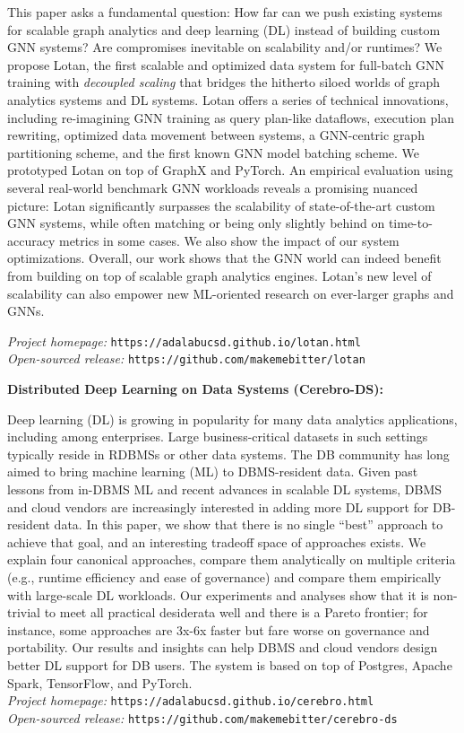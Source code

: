 \documentclass[margin,line]{res}
\begin{document}
\begin{resume}
This paper asks a fundamental question: How far can we push existing systems for scalable graph analytics and deep learning (DL) instead of building custom GNN systems? Are compromises inevitable on scalability and/or runtimes? We propose Lotan, the first scalable and optimized data system for full-batch GNN training with \textit{decoupled scaling} that bridges the hitherto siloed worlds of graph analytics systems and DL systems. Lotan offers a series of technical innovations, including re-imagining GNN training as query plan-like dataflows, execution plan rewriting, optimized data movement between systems, a GNN-centric graph partitioning scheme, and the first known GNN model batching scheme. We prototyped Lotan on top of GraphX and PyTorch. An empirical evaluation using several real-world benchmark GNN workloads reveals a promising nuanced picture: Lotan significantly surpasses the scalability of state-of-the-art custom GNN systems, while often matching or being only slightly behind on time-to-accuracy metrics in some cases. We also show the impact of our system optimizations. Overall, our work shows that the GNN world can indeed benefit from building on top of scalable graph analytics engines. Lotan's new level of scalability can also empower new ML-oriented research on ever-larger graphs and GNNs.

\textit{Project homepage: }\texttt{https://adalabucsd.github.io/lotan.html}\\
\textit{Open-sourced release: }\texttt{https://github.com/makemebitter/lotan}

{\bf Distributed Deep Learning on Data Systems (Cerebro-DS):}

Deep learning (DL) is growing in popularity for many data analytics applications, including among enterprises. Large business-critical datasets in such settings typically reside in RDBMSs or other data systems. The DB community has long aimed to bring machine learning (ML) to DBMS-resident data. Given past lessons from in-DBMS ML and recent advances in scalable DL systems, DBMS and cloud vendors are increasingly interested in adding more DL support for DB-resident data. In this paper, we show that there is no single ``best'' approach to achieve that goal, and an interesting tradeoff space of approaches exists. We explain four canonical approaches, compare them analytically on multiple criteria (e.g., runtime efficiency and ease of governance) and compare them empirically with large-scale DL workloads. Our experiments and analyses show that it is non-trivial to meet all practical desiderata well and there is a Pareto frontier; for instance, some approaches are 3x-6x faster but fare worse on governance and portability. Our results and insights can help DBMS and cloud vendors design better DL support for DB users. The system is based on top of Postgres, Apache Spark, TensorFlow, and PyTorch. \\
\textit{Project homepage: }\texttt{https://adalabucsd.github.io/cerebro.html}\\
\textit{Open-sourced release: }\texttt{https://github.com/makemebitter/cerebro-ds}


\end{resume}
\end{document}
